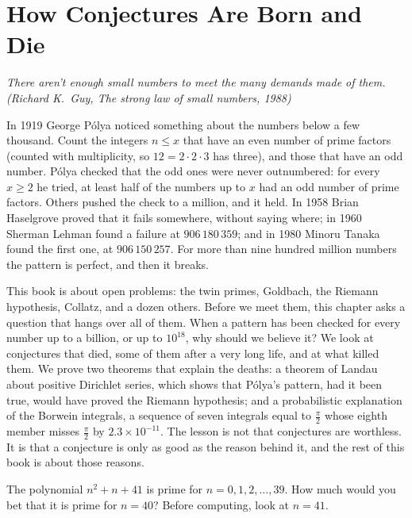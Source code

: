 \chapter{How Conjectures Are Born and Die}\label{conjectures:ch:born}

\begin{center}\itshape
There aren't enough small numbers to meet the many demands made of them.
\upshape(Richard K.~Guy, \emph{The strong law of small numbers}, 1988)
\end{center}

In 1919 George P\'olya noticed something about the numbers below a few thousand. Count the integers $n\le x$ that have an even number of prime factors
(counted with multiplicity, so $12=2\cdot2\cdot3$ has three), and those that have an odd number. P\'olya checked that the odd ones were never outnumbered: for every
$x\ge2$ he tried, at least half of the numbers up to $x$ had an odd number of prime factors. Others pushed the check to a million, and it held. In 1958 Brian
Haselgrove proved that it fails somewhere, without saying where; in 1960 Sherman Lehman found a failure at $906\,180\,359$; and in 1980 Minoru Tanaka found the
first one, at $906\,150\,257$. For more than nine hundred million numbers the pattern is perfect, and then it breaks.

This book is about open problems: the twin primes, Goldbach, the Riemann hypothesis, Collatz, and a dozen others. Before we meet them, this chapter asks a
question that hangs over all of them. When a pattern has been checked for every number up to a billion, or up to $10^{18}$, why should we believe it? We
look at conjectures that died, some of them after a very long life, and at what killed them. We prove two theorems that explain the deaths: a theorem of
Landau about positive Dirichlet series, which shows that P\'olya's pattern, had it been true, would have proved the Riemann hypothesis; and a probabilistic
explanation of the Borwein integrals, a sequence of seven integrals equal to $\frac\pi2$ whose eighth member misses $\frac\pi2$ by $2.3\times10^{-11}$. The lesson
is not that conjectures are worthless. It is that a conjecture is only as good as the reason behind it, and the rest of this book is about those reasons.

\begin{think}
The polynomial $n^2+n+41$ is prime for $n=0,1,2,\dots,39$. How much would you bet that it is prime for $n=40$? Before computing, look at $n=41$.
\end{think}

